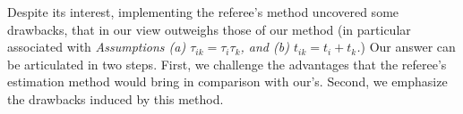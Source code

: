 \documentclass[a4paper,11pt]{article}
\begin{document}
Despite its interest, implementing the referee's method uncovered some drawbacks, that in our view outweighs those of our method (in particular associated with \textit{Assumptions (a) $\tau_{ik} = \tau_i\tau_{k}$, and (b) $t_{ik} = t_i+ t_{k}$.}) Our answer can be articulated in two steps. First, we challenge the advantages that the referee's estimation method would bring in comparison with our's. Second, we emphasize the drawbacks induced by this method. \smallskip
%
%
%
%
%
%
\end{document}

